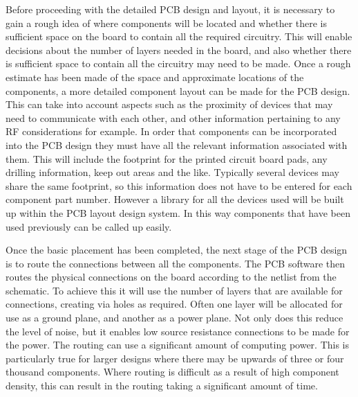 Before proceeding with the detailed PCB design and layout, it is necessary to gain a rough idea of where components will be located and whether there is sufficient space on the board to contain all the required circuitry. This will enable decisions about the number of layers needed in the board, and also whether there is sufficient space to contain all the circuitry may need to be made. Once a rough estimate has been made of the space and approximate locations of the components, a more detailed component layout can be made for the PCB design. This can take into account aspects such as the proximity of devices that may need to communicate with each other, and other information pertaining to any RF considerations for example. In order that components can be incorporated into the PCB design they must have all the relevant information associated with them. This will include the footprint for the printed circuit board pads, any drilling information, keep out areas and the like. Typically several devices may share the same footprint, so this information does not have to be entered for each component part number. However a library for all the devices used will be built up within the PCB layout design system. In this way components that have been used previously can be called up easily. \hfill \break

Once the basic placement has been completed, the next stage of the PCB design is to route the connections between all the components. The PCB software then routes the physical connections on the board according to the netlist from the schematic. To achieve this it will use the number of layers that are available for connections, creating via holes as required. Often one layer will be allocated for use as a ground plane, and another as a power plane. Not only does this reduce the level of noise, but it enables low source resistance connections to be made for the power. The routing can use a significant amount of computing power. This is particularly true for larger designs where there may be upwards of three or four thousand components. Where routing is difficult as a result of high component density, this can result in the routing taking a significant amount of time.

\pagebreak